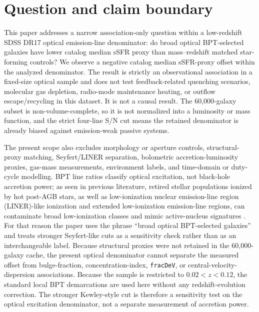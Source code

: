 \documentclass[twocolumn]{aastex631}
\begin{document}

\section{Question and claim boundary}
This paper addresses a narrow association-only question within a low-redshift SDSS DR17 optical emission-line denominator: do broad optical BPT-selected galaxies have lower catalog median sSFR proxy than mass--redshift matched star-forming controls? We observe a negative catalog median sSFR-proxy offset within the analyzed denominator. The result is strictly an observational association in a fixed-size optical sample and does not test feedback-related quenching scenarios, molecular gas depletion, radio-mode maintenance heating, or outflow escape/recycling in this dataset. It is not a causal result. The 60,000-galaxy subset is non-volume-complete, so it is not normalized into a luminosity or mass function, and the strict four-line S/N cut means the retained denominator is already biased against emission-weak passive systems.


The present scope also excludes morphology or aperture controls, structural-proxy matching, Seyfert/LINER separation, bolometric accretion-luminosity proxies, gas-mass measurements, environment labels, and time-domain or duty-cycle modelling. BPT line ratios classify optical excitation, not black-hole accretion power; as seen in previous literature, retired stellar populations ionized by hot post-AGB stars, as well as low-ionization nuclear emission-line region (LINER)-like ionization and extended low-ionization emission-line regions, can contaminate broad low-ionization classes and mimic active-nucleus signatures \citep{cidfernandes2011,stasinska2008,stasinska2015,belfiore2016}. For that reason the paper uses the phrase ``broad optical BPT-selected galaxies'' and treats stronger Seyfert-like cuts as a sensitivity check rather than as an interchangeable label. Because structural proxies were not retained in the 60,000-galaxy cache, the present optical denominator cannot separate the measured offset from bulge-fraction, concentration-index, \texttt{fracDeV}, or central-velocity-dispersion associations. Because the sample is restricted to $0.02<z<0.12$, the standard local BPT demarcations are used here without any redshift-evolution correction. The stronger Kewley-style cut is therefore a sensitivity test on the optical excitation denominator, not a separate measurement of accretion power.
\end{document}
